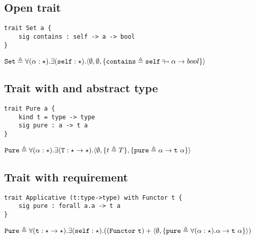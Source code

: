 \documentclass{article}[11pt]
\newcommand{\term}[1]{\verb~#1~}
\begin{document}
    \subsection{Open trait}

    \begin{verbatim}
trait Set a {
    sig contains : self -> a -> bool
}
    \end{verbatim}

    \noindent
    \begin{math}
        \term{Set} \triangleq \forall(\alpha:\star).\exists(\term{self}:\star).\langle
        \emptyset,
        \emptyset,
        \{ \term{contains} \triangleq \term{self} \looparrowright \alpha \rightarrow bool \} \rangle
    \end{math}

    \subsection{Trait with and abstract type}

    \begin{verbatim}
trait Pure a {
    kind t = type -> type
    sig pure : a -> t a
}
    \end{verbatim}

    \noindent
    \begin{math}
        \term{Pure} \triangleq \forall(\alpha:\star).\exists(\term{T}:\star \rightarrow \star).\langle
        \emptyset,
        \{t \triangleq T\},
        \{ \term{pure} \triangleq \alpha \rightarrow \term{t}~\alpha \} \rangle
    \end{math}

    \subsection{Trait with requirement}\label{subsec:trait-with-requirement}

    \begin{verbatim}
trait Applicative (t:type->type) with Functor t {
    sig pure : forall a.a -> t a
}
    \end{verbatim}

    \noindent
    \begin{math}
        \term{Pure} \triangleq \forall(\term{t}:\star \rightarrow \star).\exists(\term{self}:\star).((\term{Functor}~\term{t}) + \langle
        \emptyset,
        \{ \term{pure} \triangleq \forall(\alpha:\star).\alpha \rightarrow \term{t}~\alpha \} \rangle)
    \end{math}
\end{document}

